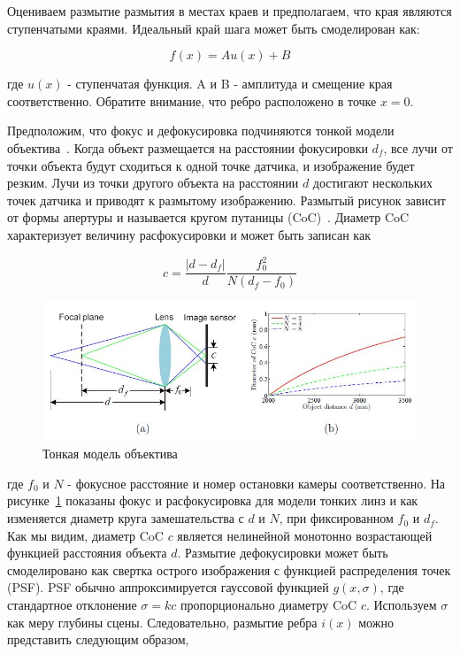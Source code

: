 Оцениваем размытие размытия в местах краев и предполагаем, что края являются ступенчатыми краями. Идеальный край шага может быть смоделирован как:

\begin{equation}\label{eq:1}
f(x)=Au(x)+B
\end{equation}

где $u(x)$ - ступенчатая функция. A и B - амплитуда и смещение края соответственно. Обратите внимание, что ребро расположено в точке $x=0$.

Предположим, что фокус и дефокусировка подчиняются тонкой модели объектива~\cite{Optics}. Когда объект размещается на расстоянии фокусировки $d_f$, все лучи от точки объекта будут сходиться к одной точке датчика, и изображение будет резким. Лучи из точки другого объекта на расстоянии $d$ достигают нескольких точек датчика и приводят к размытому изображению. Размытый рисунок зависит от формы апертуры и называется кругом путаницы (CoC)~\cite{Optics}. Диаметр CoC характеризует величину расфокусировки и может быть записан как

\begin{equation}\label{eq:2}
c=\frac{|d-d_f|}{d}\frac{f_0^2}{N(d_f-f_0)}
\end{equation}

\begin{figure}[H]
	\centering
	\includegraphics[width=1\linewidth]{pics/focus}
	\caption{Тонкая модель объектива}
	\label{fig:focus}
\end{figure}

где $f_0$ и $N$ - фокусное расстояние и номер остановки камеры соответственно. На рисунке~\ref{fig:focus} показаны фокус и расфокусировка для модели тонких линз и как изменяется диаметр круга замешательства с $d$ и $N$, при фиксированном $f_0$ и $d_f$.
Как мы видим, диаметр CoC $c$ является нелинейной монотонно возрастающей функцией расстояния объекта $d$. Размытие дефокусировки может быть смоделировано как свертка острого изображения с функцией распределения точек (PSF). PSF обычно аппроксимируется гауссовой функцией $g(x,\sigma)$, где стандартное отклонение $\sigma=kc$ пропорционально диаметру CoC $c$. Используем $\sigma$ как меру глубины сцены. Следовательно, размытие ребра $i(x)$ можно представить следующим образом,

